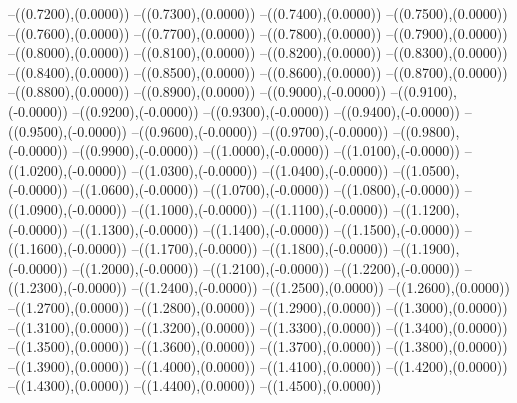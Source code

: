 {	--({\sx*(0.7200)},{\sy*(0.0000)})
	--({\sx*(0.7300)},{\sy*(0.0000)})
	--({\sx*(0.7400)},{\sy*(0.0000)})
	--({\sx*(0.7500)},{\sy*(0.0000)})
	--({\sx*(0.7600)},{\sy*(0.0000)})
	--({\sx*(0.7700)},{\sy*(0.0000)})
	--({\sx*(0.7800)},{\sy*(0.0000)})
	--({\sx*(0.7900)},{\sy*(0.0000)})
	--({\sx*(0.8000)},{\sy*(0.0000)})
	--({\sx*(0.8100)},{\sy*(0.0000)})
	--({\sx*(0.8200)},{\sy*(0.0000)})
	--({\sx*(0.8300)},{\sy*(0.0000)})
	--({\sx*(0.8400)},{\sy*(0.0000)})
	--({\sx*(0.8500)},{\sy*(0.0000)})
	--({\sx*(0.8600)},{\sy*(0.0000)})
	--({\sx*(0.8700)},{\sy*(0.0000)})
	--({\sx*(0.8800)},{\sy*(0.0000)})
	--({\sx*(0.8900)},{\sy*(0.0000)})
	--({\sx*(0.9000)},{\sy*(-0.0000)})
	--({\sx*(0.9100)},{\sy*(-0.0000)})
	--({\sx*(0.9200)},{\sy*(-0.0000)})
	--({\sx*(0.9300)},{\sy*(-0.0000)})
	--({\sx*(0.9400)},{\sy*(-0.0000)})
	--({\sx*(0.9500)},{\sy*(-0.0000)})
	--({\sx*(0.9600)},{\sy*(-0.0000)})
	--({\sx*(0.9700)},{\sy*(-0.0000)})
	--({\sx*(0.9800)},{\sy*(-0.0000)})
	--({\sx*(0.9900)},{\sy*(-0.0000)})
	--({\sx*(1.0000)},{\sy*(-0.0000)})
	--({\sx*(1.0100)},{\sy*(-0.0000)})
	--({\sx*(1.0200)},{\sy*(-0.0000)})
	--({\sx*(1.0300)},{\sy*(-0.0000)})
	--({\sx*(1.0400)},{\sy*(-0.0000)})
	--({\sx*(1.0500)},{\sy*(-0.0000)})
	--({\sx*(1.0600)},{\sy*(-0.0000)})
	--({\sx*(1.0700)},{\sy*(-0.0000)})
	--({\sx*(1.0800)},{\sy*(-0.0000)})
	--({\sx*(1.0900)},{\sy*(-0.0000)})
	--({\sx*(1.1000)},{\sy*(-0.0000)})
	--({\sx*(1.1100)},{\sy*(-0.0000)})
	--({\sx*(1.1200)},{\sy*(-0.0000)})
	--({\sx*(1.1300)},{\sy*(-0.0000)})
	--({\sx*(1.1400)},{\sy*(-0.0000)})
	--({\sx*(1.1500)},{\sy*(-0.0000)})
	--({\sx*(1.1600)},{\sy*(-0.0000)})
	--({\sx*(1.1700)},{\sy*(-0.0000)})
	--({\sx*(1.1800)},{\sy*(-0.0000)})
	--({\sx*(1.1900)},{\sy*(-0.0000)})
	--({\sx*(1.2000)},{\sy*(-0.0000)})
	--({\sx*(1.2100)},{\sy*(-0.0000)})
	--({\sx*(1.2200)},{\sy*(-0.0000)})
	--({\sx*(1.2300)},{\sy*(-0.0000)})
	--({\sx*(1.2400)},{\sy*(-0.0000)})
	--({\sx*(1.2500)},{\sy*(0.0000)})
	--({\sx*(1.2600)},{\sy*(0.0000)})
	--({\sx*(1.2700)},{\sy*(0.0000)})
	--({\sx*(1.2800)},{\sy*(0.0000)})
	--({\sx*(1.2900)},{\sy*(0.0000)})
	--({\sx*(1.3000)},{\sy*(0.0000)})
	--({\sx*(1.3100)},{\sy*(0.0000)})
	--({\sx*(1.3200)},{\sy*(0.0000)})
	--({\sx*(1.3300)},{\sy*(0.0000)})
	--({\sx*(1.3400)},{\sy*(0.0000)})
	--({\sx*(1.3500)},{\sy*(0.0000)})
	--({\sx*(1.3600)},{\sy*(0.0000)})
	--({\sx*(1.3700)},{\sy*(0.0000)})
	--({\sx*(1.3800)},{\sy*(0.0000)})
	--({\sx*(1.3900)},{\sy*(0.0000)})
	--({\sx*(1.4000)},{\sy*(0.0000)})
	--({\sx*(1.4100)},{\sy*(0.0000)})
	--({\sx*(1.4200)},{\sy*(0.0000)})
	--({\sx*(1.4300)},{\sy*(0.0000)})
	--({\sx*(1.4400)},{\sy*(0.0000)})
	--({\sx*(1.4500)},{\sy*(0.0000)})
}
